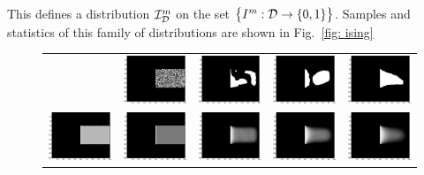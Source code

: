 This defines a distribution $\mathcal{I}^m_{\mathcal{D}}$ on the set $\bigl\{I^m:\mathcal{D}\to\{0,1\}\bigr\}$. 
Samples and statistics of this family of distributions are shown in Fig.\ \ref{fig: ising}
\begin{figure}
\begin{tabular}{ccccc}
&
\includegraphics[width=.75in, trim={2.1in .8in .1in .7in}, clip]{ising000}&
\includegraphics[width=.75in, trim={2.1in .8in .1in .7in}, clip]{ising100}&
\includegraphics[width=.75in, trim={2.1in .8in .1in .7in}, clip]{ising225}&
\includegraphics[width=.75in, trim={2.1in .8in .1in .7in}, clip]{ising400}\\
\includegraphics[width=.75in, trim={2.1in .8in .1in .7in}, clip]{visibility}&
\includegraphics[width=.75in, trim={2.1in .8in .1in .7in}, clip]{marg000}&
\includegraphics[width=.75in, trim={2.1in .8in .1in .7in}, clip]{marg100}&
\includegraphics[width=.75in, trim={2.1in .8in .1in .7in}, clip]{marg225}&
\includegraphics[width=.75in, trim={2.1in .8in .1in .7in}, clip]{marg400}\\

\end{tabular}
\end{figure}
